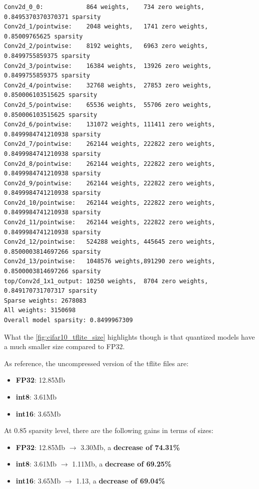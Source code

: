 \begin{lstlisting}[label={lst:uniform_weights},
    caption=MobileNet v1 and CIFAR-10: uniform weights distributions]
Conv2d_0_0:            864 weights,    734 zero weights,    0.8495370370370371 sparsity
Conv2d_1/pointwise:    2048 weights,   1741 zero weights,   0.85009765625 sparsity
Conv2d_2/pointwise:    8192 weights,   6963 zero weights,   0.8499755859375 sparsity
Conv2d_3/pointwise:    16384 weights,  13926 zero weights,  0.8499755859375 sparsity
Conv2d_4/pointwise:    32768 weights,  27853 zero weights,  0.850006103515625 sparsity
Conv2d_5/pointwise:    65536 weights,  55706 zero weights,  0.850006103515625 sparsity
Conv2d_6/pointwise:    131072 weights, 111411 zero weights, 0.8499984741210938 sparsity
Conv2d_7/pointwise:    262144 weights, 222822 zero weights, 0.8499984741210938 sparsity
Conv2d_8/pointwise:    262144 weights, 222822 zero weights, 0.8499984741210938 sparsity
Conv2d_9/pointwise:    262144 weights, 222822 zero weights, 0.8499984741210938 sparsity
Conv2d_10/pointwise:   262144 weights, 222822 zero weights, 0.8499984741210938 sparsity
Conv2d_11/pointwise:   262144 weights, 222822 zero weights, 0.8499984741210938 sparsity
Conv2d_12/pointwise:   524288 weights, 445645 zero weights, 0.8500003814697266 sparsity
Conv2d_13/pointwise:   1048576 weights,891290 zero weights, 0.8500003814697266 sparsity
top/Conv2d_1x1_output: 10250 weights,  8704 zero weights,   0.849170731707317 sparsity
Sparse weights: 2678083
All weights: 3150698
Overall model sparsity: 0.8499967309
\end{lstlisting}

What the \autoref{fig:cifar10_tflite_size} highlights though is that quantized
models have a much smaller size compared to FP32.

As reference, the uncompressed version of the tflite files are:
\begin{itemize}
    \item \textbf{FP32}: 12.85Mb
    \item \textbf{int8}: 3.61Mb
    \item \textbf{int16}: 3.65Mb
\end{itemize}

At 0.85 sparsity level, there are the following gains in terms of sizes:
\begin{itemize}
    \item \textbf{FP32}: 12.85Mb $\rightarrow$ 3.30Mb, a \textbf{decrease of 74.31\%}
    \item \textbf{int8}: 3.61Mb $\rightarrow$ 1.11Mb, a \textbf{decrease of 69.25\%}
    \item \textbf{int16}: 3.65Mb $\rightarrow$ 1.13, a \textbf{decrease of 69.04\%}
\end{itemize}

